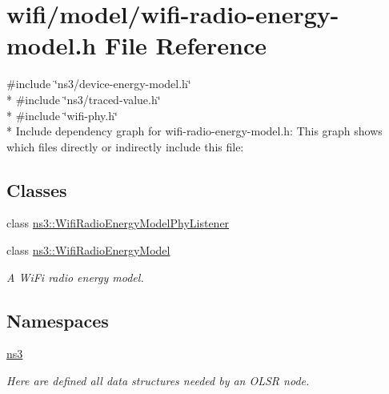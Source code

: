 \hypertarget{wifi-radio-energy-model_8h}{}\section{wifi/model/wifi-\/radio-\/energy-\/model.h File Reference}
\label{wifi-radio-energy-model_8h}
{\ttfamily \#include \char`\"{}ns3/device-\/energy-\/model.\+h\char`\"{}}\\*
{\ttfamily \#include \char`\"{}ns3/traced-\/value.\+h\char`\"{}}\\*
{\ttfamily \#include \char`\"{}wifi-\/phy.\+h\char`\"{}}\\*
Include dependency graph for wifi-\/radio-\/energy-\/model.h\+:
This graph shows which files directly or indirectly include this file\+:
\subsection*{Classes}
\begin{DoxyCompactItemize}
\item 
class \hyperlink{classns3_1_1WifiRadioEnergyModelPhyListener}{ns3\+::\+Wifi\+Radio\+Energy\+Model\+Phy\+Listener}
\item 
class \hyperlink{classns3_1_1WifiRadioEnergyModel}{ns3\+::\+Wifi\+Radio\+Energy\+Model}
\begin{DoxyCompactList}\small\item\em A Wi\+Fi radio energy model. \end{DoxyCompactList}\end{DoxyCompactItemize}
\subsection*{Namespaces}
\begin{DoxyCompactItemize}
\item 
 \hyperlink{namespacens3}{ns3}
\begin{DoxyCompactList}\small\item\em Here are defined all data structures needed by an O\+L\+SR node. \end{DoxyCompactList}\end{DoxyCompactItemize}
